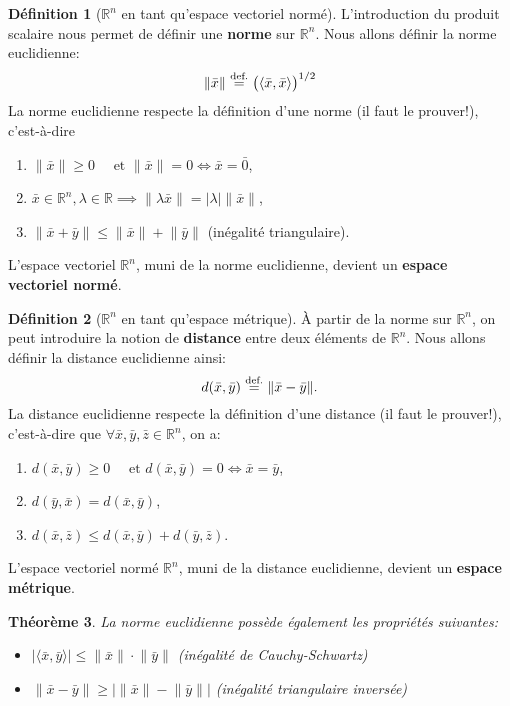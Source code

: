 \documentclass{report}
\theoremstyle{plain}
\newtheorem{thm}{Théorème}[chapter]
\theoremstyle{definition}
\newtheorem{defn}[thm]{Définition}
\theoremstyle{remark}
\newcommand*\eqdef{\; \stackrel{ \mathclap{ \normalfont\text{def.} } }{ = } \;} %
\newcommand*{\norm}[1]{\lVert#1\rVert}
\newcommand*{\abs}[1]{\lvert#1\rvert}
\begin{document}
\begin{defn}[$\mathbb R^n$ en tant qu'espace vectoriel normé]
	L'introduction du produit scalaire nous permet de définir une \textbf{norme} sur $\mathbb R^n$. Nous allons définir la norme euclidienne:
	\begin{equation}
		\norm{\bar x} \eqdef \bigl( \langle \bar x, \bar x \rangle \bigr)^{1/2}
	\end{equation}
	La norme euclidienne respecte la définition d'une norme (il faut le prouver!), c'est-à-dire
	\begin{enumerate}
		\item $\norm{\bar x} \geq 0 \quad \text{ et } \norm{\bar x} = 0 \iff \bar x = \bar 0$,
		\item $\bar x \in \mathbb R^n, \lambda \in \mathbb R \implies \norm{\lambda \bar x} = \abs{\lambda}\norm{\bar x}$,
		\item $\norm{\bar x + \bar y} \leq \norm{\bar x} + \norm{\bar y}$ (inégalité triangulaire).
	\end{enumerate}
	L'espace vectoriel $\mathbb R^n$, muni de la norme euclidienne, devient un \textbf{espace vectoriel normé}.
\end{defn}

\begin{defn}[$\mathbb R^n$ en tant qu'espace métrique]
	À partir de la norme sur $\mathbb R^n$, on peut introduire la notion de \textbf{distance} entre deux éléments de $\mathbb R^n$. Nous allons définir la distance euclidienne ainsi:
	\begin{equation}
		d(\bar x, \bar y) \eqdef \norm{\bar x - \bar y}.
	\end{equation}
	La distance euclidienne respecte la définition d'une distance (il faut le prouver!), c'est-à-dire que $\forall \bar x, \bar y, \bar z \in \mathbb R^n$, on a:
	\begin{enumerate}
		\item $d(\bar x, \bar y) \geq 0 \quad \text{ et } d(\bar x, \bar y) = 0 \iff \bar x = \bar y$,
		\item $d(\bar y, \bar x) = d(\bar x, \bar y)$,
		\item $d(\bar x, \bar z) \leq d(\bar x, \bar y) + d(\bar y, \bar z)$.
	\end{enumerate}
	L'espace vectoriel normé $\mathbb R^n$, muni de la distance euclidienne, devient un \textbf{espace métrique}.
\end{defn}

\begin{thm}
	La norme euclidienne possède également les propriétés suivantes:
	\begin{itemize}
		\item $\abs{\langle \bar x, \bar y \rangle} \leq \norm{\bar x} \cdot \norm{\bar y}$ \quad (inégalité de Cauchy-Schwartz)
		\item $\norm{\bar x - \bar y} \geq \abs{\norm{\bar x} - \norm{\bar y}}$ \quad (inégalité triangulaire inversée)
	\end{itemize}
\end{thm}
\end{document}
